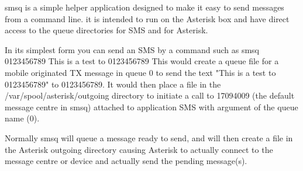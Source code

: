    smsq is a simple helper application designed to make it easy to send
   messages from a command line. it is intended to run on the Asterisk
   box and have direct access to the queue directories for SMS and for
   Asterisk.

   In its simplest form you can send an SMS by a command such as
   smsq 0123456789 This is a test to 0123456789
   This would create a queue file for a mobile originated TX message in
   queue 0 to send the text "This is a test to 0123456789" to 0123456789.
   It would then place a file in the /var/spool/asterisk/outgoing
   directory to initiate a call to 17094009 (the default message centre
   in smsq) attached to application SMS with argument of the queue name
   (0).

   Normally smsq will queue a message ready to send, and will then create
   a file in the Asterisk outgoing directory causing Asterisk to actually
   connect to the message centre or device and actually send the pending
   message(s).

